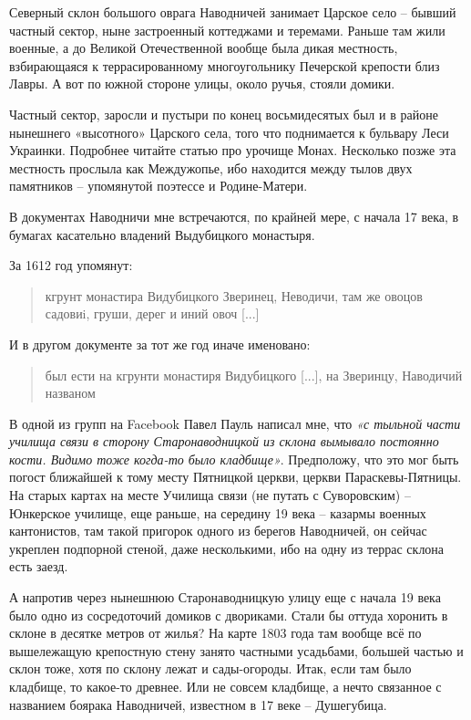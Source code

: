Северный склон большого оврага Наводничей занимает Царское село – бывший частный сектор, ныне застроенный коттеджами и теремами. Раньше там жили военные, а до Великой Отечественной вообще была дикая местность, взбирающаяся к террасированному многоугольнику Печерской крепости близ Лавры. А вот по южной стороне улицы, около ручья, стояли домики.

Частный сектор, заросли и пустыри по конец восьмидесятых был и в районе нынешнего «высотного» Царского села, того что поднимается к бульвару Леси Украинки. Подробнее читайте статью про урочище Монах. Несколько позже эта местность прослыла как Междужопье, ибо находится между тылов двух памятников – упомянутой поэтессе и Родине-Матери.

В документах Наводничи мне встречаются, по крайней мере, с начала 17 века, в бумагах касательно владений Выдубицкого монастыря. 

За 1612 год упомянут:

\begin{quotation}
\noindent кгрунт монастира Видубицкого Зверинец, Неводичи, там же овоцов садовиi, груши, дерег и иний овоч [...]  
\end{quotation}

И в другом документе за тот же год иначе именовано:

\begin{quotation}
\noindent был ести на кгрунти монастиря Видубицкого [...], на Зверинцу, Наводичий названом
\end{quotation}

В одной из групп на Facebook Павел Пауль написал мне, что \textit{«с тыльной части училища связи в сторону Старонаводницкой из склона вымывало постоянно кости. Видимо тоже когда-то было кладбище»}. Предположу, что это мог быть погост ближайшей к тому месту Пятницкой церкви, церкви Параскевы-Пятницы. На старых картах на месте Училища связи (не путать с Суворовским) – Юнкерское училище, еще раньше, на середину 19 века – казармы военных кантонистов, там такой пригорок одного из берегов Наводничей, он сейчас укреплен подпорной стеной, даже несколькими, ибо на одну из террас склона есть заезд.

А напротив через нынешнюю Старонаводницкую улицу еще с начала 19 века было одно из сосредоточий домиков с двориками. Стали бы оттуда хоронить в склоне в десятке метров от жилья? На карте 1803 года там вообще всё по вышележащую крепостную стену занято частными усадьбами, большей частью и склон тоже, хотя по склону лежат и сады-огороды. Итак, если там было кладбище, то какое-то древнее. Или не совсем кладбище, а нечто связанное с названием боярака Наводничей, известном в 17 веке – Душегубица.

